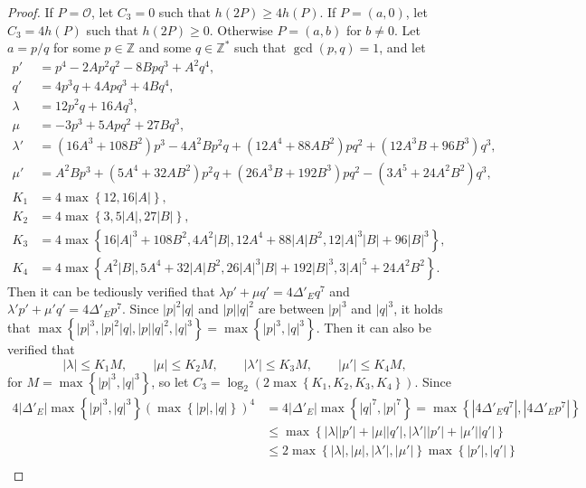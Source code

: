 \documentclass{article}
\newcommand{\Z}{\mathbb{Z}}
\newcommand{\rb}[1]{\left( #1 \right)}
\newcommand{\cb}[1]{\left\{ #1 \right\}}
\newcommand{\abs}[1]{\left\lvert #1 \right\rvert}
\theoremstyle{definition}
\begin{document}
\begin{proof}
If $ P = \mathcal{O} $, let $ C_3 = 0 $ such that $ h\rb{2P} \ge 4h\rb{P} $. If $ P = \rb{a, 0} $, let $ C_3 = 4h\rb{P} $ such that $ h\rb{2P} \ge 0 $. Otherwise $ P = \rb{a, b} $ for $ b \ne 0 $. Let $ a = p / q $ for some $ p \in \Z $ and some $ q \in \Z^* $ such that $ \gcd\rb{p, q} = 1 $, and let
\begin{align*}
p' & = p^4 - 2Ap^2q^2 - 8Bpq^3 + A^2q^4, \\
q' & = 4p^3q + 4Apq^3 + 4Bq^4, \\
\lambda & = 12p^2q + 16Aq^3, \\
\mu & = -3p^3 + 5Apq^2 + 27Bq^3, \\
\lambda' & = \rb{16A^3 + 108B^2}p^3 - 4A^2Bp^2q + \rb{12A^4 + 88AB^2}pq^2 + \rb{12A^3B + 96B^3}q^3, \\
\mu' & = A^2Bp^3 + \rb{5A^4 + 32AB^2}p^2q + \rb{26A^3B + 192B^3}pq^2 - \rb{3A^5 + 24A^2B^2}q^3, \\
K_1 & = 4\max\cb{12, 16\abs{A}}, \\
K_2 & = 4\max\cb{3, 5\abs{A}, 27\abs{B}}, \\
K_3 & = 4\max\cb{16\abs{A}^3 + 108B^2, 4A^2\abs{B}, 12A^4 + 88\abs{A}B^2, 12\abs{A}^3\abs{B} + 96\abs{B}^3}, \\
K_4 & = 4\max\cb{A^2\abs{B}, 5A^4 + 32\abs{A}B^2, 26\abs{A}^3\abs{B} + 192\abs{B}^3, 3\abs{A}^5 + 24A^2B^2}.
\end{align*}
Then it can be tediously verified that $ \lambda p' + \mu q' = 4\Delta'_E q^7 $ and $ \lambda' p' + \mu' q' = 4\Delta'_E p^7 $. Since $ \abs{p}^2\abs{q} $ and $ \abs{p}\abs{q}^2 $ are between $ \abs{p}^3 $ and $ \abs{q}^3 $, it holds that $ \max\cb{\abs{p}^3, \abs{p}^2\abs{q}, \abs{p}\abs{q}^2, \abs{q}^3} = \max\cb{\abs{p}^3, \abs{q}^3} $. Then it can also be verified that
$$ \abs{\lambda} \le K_1M, \qquad \abs{\mu} \le K_2M, \qquad \abs{\lambda'} \le K_3M, \qquad \abs{\mu'} \le K_4M, $$
for $ M = \max\cb{\abs{p}^3, \abs{q}^3} $, so let $ C_3 = \log_2\rb{2\max\cb{K_1, K_2, K_3, K_4}} $. Since
\begin{align*}
4\abs{\Delta'_E}\max\cb{\abs{p}^3, \abs{q}^3}\rb{\max\cb{\abs{p}, \abs{q}}}^4
& = 4\abs{\Delta'_E}\max\cb{\abs{q}^7, \abs{p}^7}
= \max\cb{\abs{4\Delta'_E q^7}, \abs{4\Delta'_E p^7}} \\
& \le \max\cb{\abs{\lambda}\abs{p'} + \abs{\mu}\abs{q'}, \abs{\lambda'}\abs{p'} + \abs{\mu'}\abs{q'}} \\
& \le 2\max\cb{\abs{\lambda}, \abs{\mu}, \abs{\lambda'}, \abs{\mu'}}\max\cb{\abs{p'}, \abs{q'}} \\

\end{align*}
\end{proof}
\end{document}
